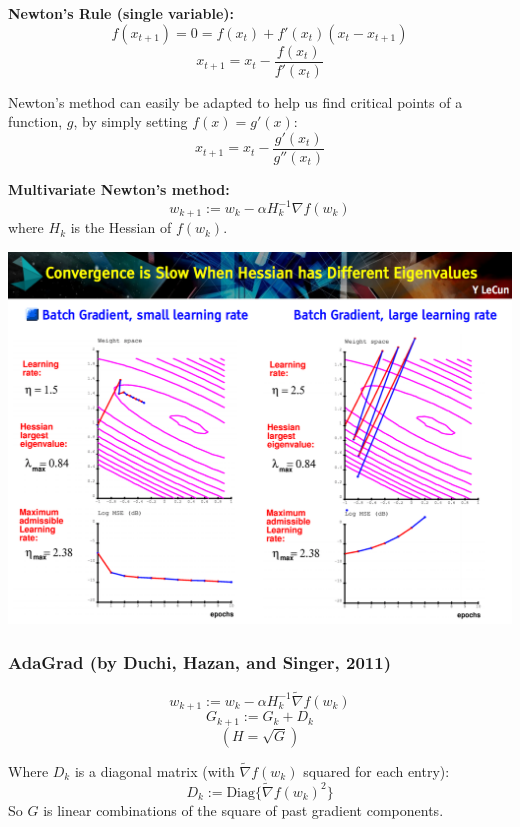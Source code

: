 \documentclass[12pt]{article}
\begin{document}

\vspace{3mm}
\textbf{Newton's Rule (single variable):}
$$
f(x_{t+1}) = 0 = f(x_t) + f'(x_t) (x_t - x_{t+1})
$$
$$
x_{t+1} = x_t - \dfrac{ f(x_t) }{ f'(x_t) }
$$

Newton's method can easily be adapted to help us find critical points of a function, $g$, by simply setting $f(x) = g'(x)$:
$$
x_{t+1} = x_t - \dfrac{ g'(x_t) }{ g''(x_t) }
$$

\vspace{3mm}
\textbf{Multivariate Newton's method:}
$$w_{k+1} := w_{k} - \alpha H_k^{-1}  \nabla f ( w_k )$$
where $H_k$ is the Hessian of $f( w_k )$.

\vspace{5mm}
\includegraphics[width=1\textwidth]{hessian}



\subsubsection{AdaGrad (by Duchi, Hazan, and Singer, 2011)}
$$w_{k+1} := w_{k} - \alpha H^{ -1}_k \tilde{ \nabla } f ( w_k ) $$
$$G_{k+1} := G_k + D_k$$
$$( H = \sqrt{G} ) $$

Where $D_k$ is a diagonal matrix (with $\tilde{ \nabla } f(w_k)$ squared for each entry):
$$D_k := \text{Diag} \{ \tilde{ \nabla } f(w_k)^2 \}$$
So $G$ is linear combinations of the square of past gradient components.
\end{document}
